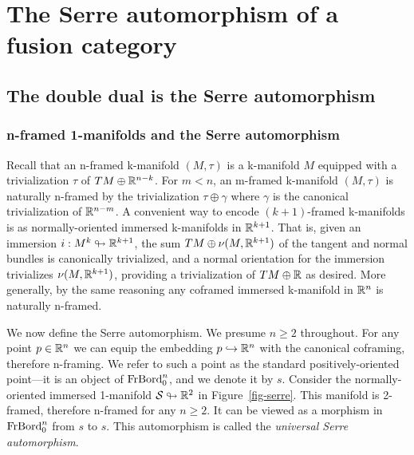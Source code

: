 \documentclass{amsart}
\begin{document}

\section{The Serre automorphism of a fusion category} \label{sec-serre}




\subsection{The double dual is the Serre automorphism} \label{sec-serre-dd}



\subsubsection{n-framed 1-manifolds and the Serre automorphism} \label{sec-serre-oneman}

Recall that an n-framed k-manifold $(M,\tau)$ is a k-manifold $M$ equipped with a trivialization $\tau$ of $TM \oplus \mathbb R^{n-k}$.  For $m < n$, an m-framed k-manifold $(M,\tau)$ is naturally n-framed by the trivialization $\tau \oplus \gamma$ where $\gamma$ is the canonical trivialization of $\mathbb R^{n-m}$.  A convenient way to encode $(k+1)$-framed k-manifolds is as normally-oriented immersed k-manifolds in $\mathbb R^{k+1}$.  That is, given an immersion $i: M^k \looparrowright \mathbb R^{k+1}$, the sum $TM \oplus \nu(M,\mathbb R^{k+1})$ of the tangent and normal bundles is canonically trivialized, and a normal orientation for the immersion trivializes $\nu(M,\mathbb R^{k+1})$, providing a trivialization of $TM \oplus \mathbb R$ as desired.  More generally, by the same reasoning any coframed immersed k-manifold in $\mathbb R^n$ is naturally n-framed.

We now define the Serre automorphism.  We presume $n \geq 2$ throughout.  For any point $p \in \mathbb R^n$ we can equip the embedding $p \hookrightarrow \mathbb R^n$ with the canonical coframing, therefore n-framing.  We refer to such a point as the standard positively-oriented point---it is an object of $\mathrm{FrBord}_0^n$, and we denote it by $s$.  Consider the normally-oriented immersed 1-manifold $\mathcal S \looparrowright \mathbb R^2$ in Figure~\ref{fig-serre}.  This manifold is 2-framed, therefore n-framed for any $n \geq 2$.  It can be viewed as a morphism in $\mathrm{FrBord}_0^n$ from $s$ to $s$.  This automorphism is called the \emph{universal Serre automorphism}.  
\end{document}
